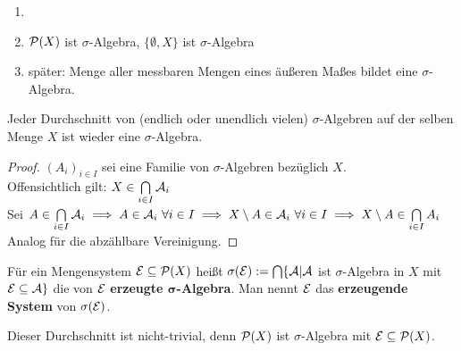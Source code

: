 \documentclass[11pt,a4paper,fleqn,openany]{report}
\begin{document}
    \begin{example}
      \begin{enumerate}
        \item[]
        \item $\mathcal{P}(X)$ ist $\sigma$-Algebra, $\{\emptyset, X\}$ ist $\sigma$-Algebra
        \item später: Menge aller messbaren Mengen eines äußeren Maßes bildet eine $\sigma$-Algebra.
      \end{enumerate}
    \end{example}
    
    \begin{theorem}
      Jeder Durchschnitt von (endlich oder unendlich vielen) $\sigma$-Algebren auf der selben Menge $X$ ist wieder eine $\sigma$-Algebra.
    \end{theorem}

    \begin{proof}
      $(A_i)_{i \in I}$ sei eine Familie von $\sigma$-Algebren bezüglich $X$.\\
      Offensichtlich gilt: $X \in \bigcap\limits_{i \in I} \mathcal{A}_i$\\
      Sei $A \in \bigcap\limits_{i \in I} \mathcal{A}_i \implies A \in \mathcal{A}_i \ \forall i \in I \implies X \setminus A \in \mathcal{A}_i \ \forall i \in I \implies X \setminus A \in \bigcap\limits_{i \in I} A_i$\\
      Analog für die abzählbare Vereinigung.
    \end{proof}

    \begin{definition}
      Für ein Mengensystem $\mathcal{E} \subseteq \mathcal{P}(X)$ heißt $\sigma(\mathcal{E}) := \bigcap\{\mathcal{A}|\mathcal{A}$ ist $\sigma$-Algebra in $X$ mit $\mathcal{E} \subseteq \mathcal{A}\}$ die von $\mathcal{E}$ \textbf{erzeugte $\bm{\sigma}$-Algebra}. Man nennt $\mathcal{E}$ das \textbf{erzeugende System} von $\sigma(\mathcal{E})$.
    \end{definition}

    \begin{remark}
      Dieser Durchschnitt ist nicht-trivial, denn $\mathcal{P}(X)$ ist $\sigma$-Algebra mit $\mathcal{E} \subseteq \mathcal{P}(X)$.
    \end{remark}
\end{document}
